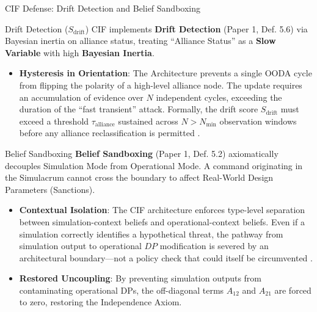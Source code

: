 \documentclass[
  ignorenonframetext,
]{beamer}
\providecommand{\tightlist}{%
  \setlength{\itemsep}{0pt}\setlength{\parskip}{0pt}}
\begin{document}
\begin{frame}[allowframebreaks]{CIF Defense: Drift Detection and Belief
Sandboxing}
\protect{}\label{cif-defense-drift-detection-and-belief-sandboxing}
\begin{block}{Drift Detection (\(S_{\text{drift}}\))}
\protect{}\label{drift-detection-s_textdrift}
CIF implements \textbf{Drift Detection} (Paper 1, Def. 5.6)
\cite{friedman2026cogsec1} via Bayesian inertia on alliance status,
treating ``Alliance Status'' as a \textbf{Slow Variable} with high
\textbf{Bayesian Inertia}.

\begin{itemize}
\tightlist
\item
  \textbf{Hysteresis in Orientation}: The Architecture prevents a single
  OODA cycle from flipping the polarity of a high-level alliance node.
  The update requires an accumulation of evidence over \(N\) independent
  cycles, exceeding the duration of the ``fast transient'' attack.
  Formally, the drift score \(S_{\text{drift}}\) must exceed a threshold
  \(\tau_{\text{alliance}}\) sustained across \(N > N_{\min}\)
  observation windows before any alliance reclassification is permitted
  \cite{friedman2026cogsec3}.
\end{itemize}
\end{block}

\begin{block}{Belief Sandboxing}
\protect{}\label{belief-sandboxing}
\textbf{Belief Sandboxing} (Paper 1, Def. 5.2)
\cite{friedman2026cogsec1} axiomatically decouples Simulation Mode from
Operational Mode. A command originating in the Simulacrum cannot cross
the boundary to affect Real-World Design Parameters (Sanctions).

\begin{itemize}
\tightlist
\item
  \textbf{Contextual Isolation}: The CIF architecture enforces
  type-level separation between simulation-context beliefs and
  operational-context beliefs. Even if a simulation correctly identifies
  a hypothetical threat, the pathway from simulation output to
  operational \(DP\) modification is severed by an architectural
  boundary---not a policy check that could itself be circumvented
  \cite{friedman2026cogsec2}.
\item
  \textbf{Restored Uncoupling}: By preventing simulation outputs from
  contaminating operational DPs, the off-diagonal terms \(A_{12}\) and
  \(A_{21}\) are forced to zero, restoring the Independence Axiom.
\end{itemize}
\end{block}
\end{frame}
\end{document}
